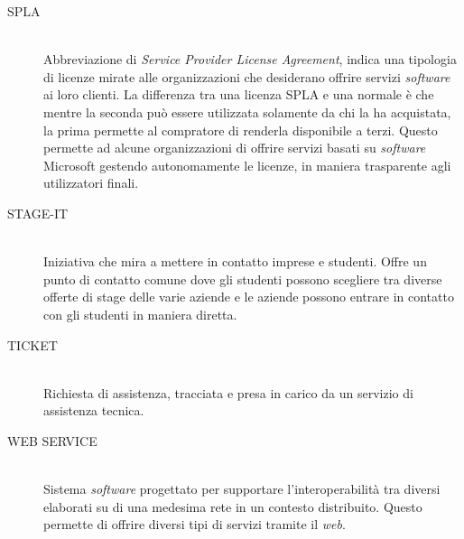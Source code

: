 \begin{description}
\item[SPLA] \hfill \\ Abbreviazione di \emph{Service Provider License Agreement}, indica una tipologia di licenze mirate alle organizzazioni che desiderano offrire servizi \emph{software} ai loro clienti. La differenza tra una licenza SPLA e una normale è che mentre la seconda può essere utilizzata solamente da chi la ha acquistata, la prima permette al compratore di renderla disponibile a terzi. Questo permette ad alcune organizzazioni di offrire servizi basati su \emph{software} Microsoft
gestendo autonomamente le licenze, in maniera trasparente agli utilizzatori finali.
\item[STAGE-IT] \hfill \\ Iniziativa che mira a mettere in contatto imprese e studenti. Offre un punto di contatto comune dove gli studenti possono scegliere tra diverse offerte di
stage delle varie aziende e le aziende possono entrare in contatto con gli studenti in maniera diretta.
\item[TICKET] \hfill \\ Richiesta di assistenza, tracciata e presa in carico da un servizio di assistenza tecnica.
\item[WEB SERVICE] \hfill \\ Sistema \emph{software}
progettato per supportare l’interoperabilità tra diversi elaborati su di una medesima rete in un contesto distribuito. Questo permette di offrire diversi tipi di servizi tramite il \emph{web}.
\end{description}
